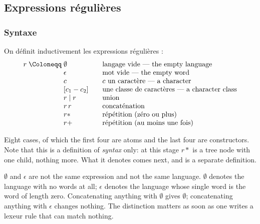 \subsection{Expressions régulières}
\subsubsection{Syntaxe}
\begin{definition}
  On définit inductivement les expressions régulières :
  \[
    \begin{array}{r@{\;}l@{\qquad}l}
      r \mathrel{\Coloneqq} & \emptyset      & \text{langage vide --- the empty language} \\
                            & \epsilon       & \text{mot vide --- the empty word} \\
                            & c              & c \text{ un caractère --- a character} \\
                            & [c_1 - c_2]    & \text{une classe de caractères --- a character class} \\
                            & r \mid r       & \text{union} \\
                            & r\,r           & \text{concaténation} \\
                            & r{*}           & \text{répétition (zéro ou plus)} \\
                            & r{+}           & \text{répétition (au moins une fois)}
    \end{array}
  \]
\end{definition}

Eight cases, of which the first four are atoms and the last four are
constructors. Note that this is a definition of \emph{syntax} only: at this
stage $r{*}$ is a tree node with one child, nothing more. What it denotes comes
next, and is a separate definition.

\begin{remark}
  $\emptyset$ and $\epsilon$ are not the same expression and not the same
  language. $\emptyset$ denotes the language with no words at all;
  $\epsilon$ denotes the language whose single word is the word of length zero.
  Concatenating anything with $\emptyset$ gives $\emptyset$; concatenating
  anything with $\epsilon$ changes nothing. The distinction matters as soon as
  one writes a lexeur rule that can match nothing.
\end{remark}

